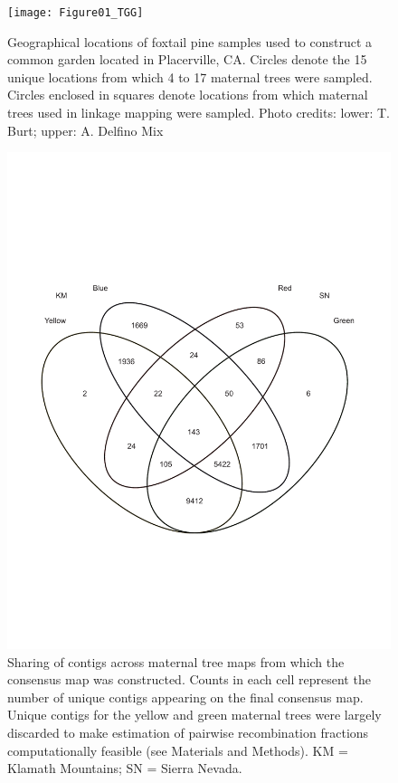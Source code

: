 \documentclass[smallextended]{svjour3}
\begin{document}
\begin{figure}[ht]
\centering
\texttt{[image: Figure01\_TGG]}
\caption{Geographical locations of foxtail pine samples used to construct a
  common garden located in Placerville, CA. Circles denote the 15 unique
  locations from which 4 to 17 maternal trees were sampled. Circles enclosed in
  squares denote locations from which maternal trees used in linkage mapping
  were sampled. Photo credits: lower: T. Burt; upper: A. Delfino Mix}
\label{f:Figure01_TGG}
\end{figure}

\clearpage

\begin{figure}[ht]
   \centering
 \includegraphics[width=1.0\textwidth]{Figure02_TGG}
 \caption{Sharing of contigs across maternal tree maps from which the consensus
   map was constructed. Counts in each cell represent the number of unique
   contigs appearing on the final consensus map. Unique contigs for the yellow
   and green maternal trees were largely discarded to make estimation of
   pairwise recombination fractions computationally feasible (see Materials and
   Methods).  KM = Klamath Mountains; SN = Sierra Nevada.}
  \label{f:Figure02_TGG}
\end{figure}
 
\end{document}
